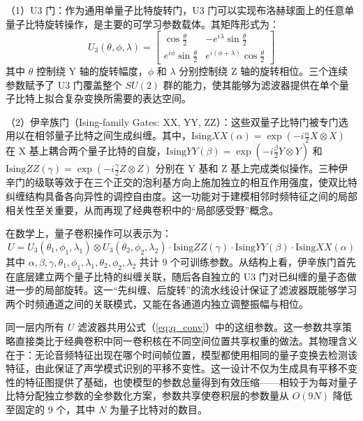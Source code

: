 （1）U3 门：作为通用单量子比特旋转门，U3 门可以实现布洛赫球面上的任意单量子比特旋转操作，是主要的可学习参数载体。其矩阵形式为：
\begin{equation}
	U_3(\theta, \phi, \lambda) = \begin{bmatrix}
		\cos\frac{\theta}{2} & -e^{i\lambda}\sin\frac{\theta}{2} \\
		e^{i\phi}\sin\frac{\theta}{2} & e^{i(\phi+\lambda)}\cos\frac{\theta}{2}
	\end{bmatrix}
	\label{eq:u3_gate}
\end{equation}
其中 $\theta$ 控制绕 Y 轴的旋转幅度，$\phi$ 和 $\lambda$ 分别控制绕 Z 轴的旋转相位。三个连续参数赋予了 U3 门覆盖整个 $SU(2)$ 群的能力，使其能够为滤波器提供在单个量子比特上拟合复杂变换所需要的表达空间。

（2）伊辛族门（Ising-family Gates: XX, YY, ZZ）：这些双量子比特门被专门选用以在相邻量子比特之间生成纠缠。其中，$\text{Ising}XX(\alpha) = \exp\left(-i \frac{\alpha}{2} X \otimes X\right)$ 在 X 基上耦合两个量子比特的自旋，$\text{Ising}YY(\beta) = \exp\left(-i \frac{\beta}{2} Y \otimes Y\right)$ 和 $\text{Ising}ZZ(\gamma) = \exp\left(-i \frac{\gamma}{2} Z \otimes Z\right)$ 分别在 Y 基和 Z 基上完成类似操作。三种伊辛门的级联等效于在三个正交的泡利基方向上施加独立的相互作用强度，使双比特纠缠结构具备各向异性的调控自由度。这一功能对于建模相邻时频特征之间的局部相关性至关重要，从而再现了经典卷积中的“局部感受野”概念。

在数学上，量子卷积操作可以表示为：
\begin{equation}
	U = U_3\left(\theta_1, \phi_1, \lambda_1\right) \otimes U_3\left(\theta_2, \phi_2, \lambda_2\right) \cdot \text{Ising}ZZ(\gamma) \cdot \text{Ising}YY(\beta) \cdot \text{Ising}XX(\alpha)
	\label{eq:q_conv}
\end{equation}
其中 $\alpha, \beta, \gamma, \theta_1, \phi_1, \lambda_1, \theta_2, \phi_2, \lambda_2$ 共计 9 个可训练参数。从结构上看，伊辛族门首先在底层建立两个量子比特的纠缠关联，随后各自独立的 U3 门对已纠缠的量子态做进一步的局部旋转。这一“先纠缠、后旋转”的流水线设计保证了滤波器既能够学习两个时频通道之间的关联模式，又能在各通道内独立调整振幅与相位。

同一层内所有 $U$ 滤波器共用公式（\ref{eq:q_conv}）中的这组参数。这一参数共享策略直接类比于经典卷积中同一卷积核在不同空间位置共享权重的做法。其物理含义在于：无论音频特征出现在哪个时间帧位置，模型都使用相同的量子变换去检测该特征，由此保证了声学模式识别的平移不变性。这一设计不仅为生成具有平移不变性的特征图提供了基础，也使模型的参数总量得到有效压缩——相较于为每对量子比特分配独立参数的全参数化方案，参数共享使卷积层的参数量从 $O(9N)$ 降低至固定的 9 个，其中 $N$ 为量子比特对的数目。

